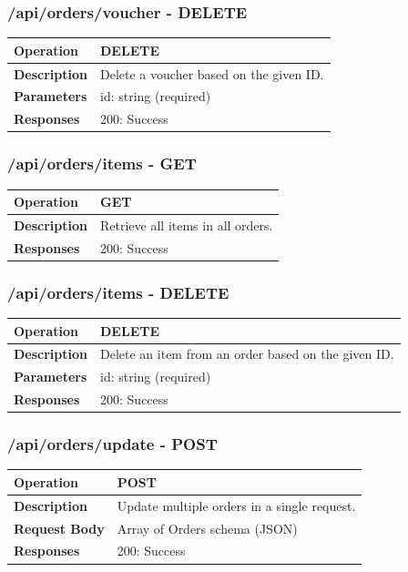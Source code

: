 \subsubsection*{/api/orders/voucher - DELETE}
\begin{tabular}{|>{\raggedright\arraybackslash}p{3cm}|p{12cm}|}
\hline
\textbf{Operation} & DELETE \\
\hline
\textbf{Description} & Delete a voucher based on the given ID. \\
\hline
\textbf{Parameters} & id: string (required) \\
\hline
\textbf{Responses} & 200: Success \\
\hline
\end{tabular}

\subsubsection*{/api/orders/items - GET}
\begin{tabular}{|>{\raggedright\arraybackslash}p{3cm}|p{12cm}|}
\hline
\textbf{Operation} & GET \\
\hline
\textbf{Description} & Retrieve all items in all orders. \\
\hline
\textbf{Responses} & 200: Success \\
\hline
\end{tabular}

\subsubsection*{/api/orders/items - DELETE}
\begin{tabular}{|>{\raggedright\arraybackslash}p{3cm}|p{12cm}|}
\hline
\textbf{Operation} & DELETE \\
\hline
\textbf{Description} & Delete an item from an order based on the given ID. \\
\hline
\textbf{Parameters} & id: string (required) \\
\hline
\textbf{Responses} & 200: Success \\
\hline
\end{tabular}

\subsubsection*{/api/orders/update - POST}
\begin{tabular}{|>{\raggedright\arraybackslash}p{3cm}|p{12cm}|}
\hline
\textbf{Operation} & POST \\
\hline
\textbf{Description} & Update multiple orders in a single request. \\
\hline
\textbf{Request Body} & Array of Orders schema (JSON) \\
\hline
\textbf{Responses} & 200: Success \\
\hline
\end{tabular}

